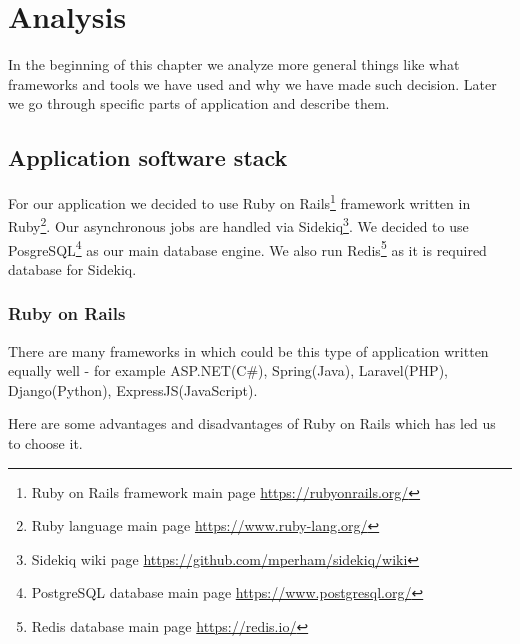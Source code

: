 \chapter{Analysis}
In the beginning of this chapter we analyze more general things like what frameworks and tools we have used and why we have made such decision. Later we go through specific parts of application and describe them. 
\section{Application software stack}
For our application we decided to use Ruby on Rails\footnote{ Ruby on Rails framework main page \url{https://rubyonrails.org/}} framework written in Ruby\footnote{ Ruby language main page \url{https://www.ruby-lang.org/}}. 
Our asynchronous jobs are handled via Sidekiq\footnote{ Sidekiq wiki page \url{https://github.com/mperham/sidekiq/wiki}}. We decided to use PosgreSQL\footnote{ PostgreSQL database main page \url{https://www.postgresql.org/}} as our main database engine. We also run Redis\footnote{ Redis database main page \url{https://redis.io/}} as it is required database for Sidekiq.
\subsection{Ruby on Rails}
There are many frameworks in which could be this type of application written equally well - for example ASP.NET(C\#), Spring(Java), Laravel(PHP), Django(Python), ExpressJS(JavaScript).

Here are some advantages and disadvantages of Ruby on Rails which has led us to choose it.

